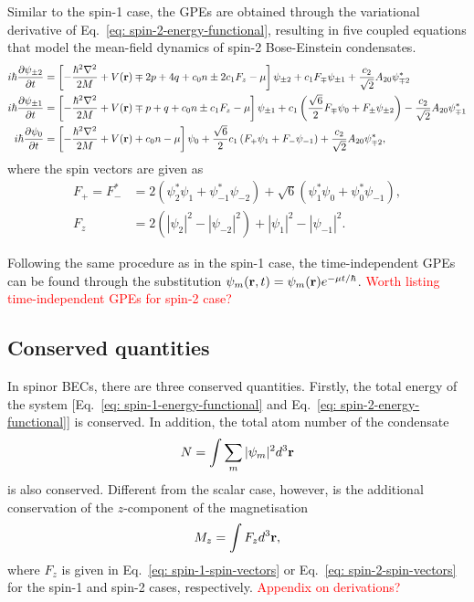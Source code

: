 Similar to the spin-1 case, the GPEs are obtained through the variational
derivative of Eq.~\eqref{eq: spin-2-energy-functional}, resulting in
five coupled equations that model the mean-field dynamics of spin-2
Bose-Einstein condensates.
\begin{align}
    i\hbar\pdv{\psi_{\pm 2}}{t} & = \left[-\frac{\hbar^2\nabla^2}{2M}
        + V(\vb{r}) \mp 2p + 4q + c_0n \pm 2c_1F_z - \mu\right]\psi_{\pm 2}
    + c_1F_{\mp}\psi_{\pm 1} + \frac{c_2}{\sqrt{2}}A_{20}\psi_{\mp 2}^*
    \label{eq: spin-2-GPEs-pm2}                                            \\
    i\hbar\pdv{\psi_{\pm 1}}{t} & = \left[-\frac{\hbar^2\nabla^2}{2M}
        + V(\vb{r}) \mp p + q + c_0n \pm c_1F_z - \mu\right]\psi_{\pm 1}
    + c_1\left(\frac{\sqrt{6}}{2}F_{\mp}\psi_0 + F_{\pm}\psi_{\pm 2}\right)
    - \frac{c_2}{\sqrt{2}}A_{20}\psi_{\mp 1}^* \label{eq: spin-2-GPEs-pm1} \\
    i\hbar\pdv{\psi_0}{t}       & = \left[-\frac{\hbar^2\nabla^2}{2M}
        + V(\vb{r}) + c_0n - \mu\right]\psi_0
    + \frac{\sqrt{6}}{2}c_1\left(F_+\psi_1 + F_-\psi_{-1}\right)
    + \frac{c_2}{\sqrt{2}}A_{20}\psi_{\mp 2}^*, \label{eq: spin-2-GPEs-0}
\end{align}
where the spin vectors are given as
\begin{align}\label{eq: spin-2-spin-vectors}
    F_+ = F_-^* & = 2(\psi_2^*\psi_1 + \psi_{-1}^*\psi_{-2})
    + \sqrt{6}(\psi_1^*\psi_0 + \psi_0^*\psi_{-1}),                             \\
    F_z         & = 2(|\psi_2|^2 - |\psi_{-2}|^2) + |\psi_1|^2 - |\psi_{-1}|^2.
\end{align}

Following the same procedure as in the spin-1 case, the time-independent GPEs
can be found through the substitution
\(\psi_m(\vb{r}, t) = \psi_m(\vb{r})e^{-\mu t/\hbar}\).
\textcolor{red}{Worth listing time-independent GPEs for spin-2 case?}

\subsection{Conserved quantities}
In spinor BECs, there are three conserved quantities.
Firstly, the total energy of the system
    [Eq.~\eqref{eq: spin-1-energy-functional} and
        Eq.~\eqref{eq: spin-2-energy-functional}] is conserved.
In addition, the total atom number of the condensate
\begin{equation}
    N = \int \sum_m |\psi_m|^2 d^3\vb{r}
\end{equation}
is also conserved.
Different from the scalar case, however, is the additional conservation of the
\(z\)-component of the magnetisation
\begin{equation}
    M_z = \int F_z d^3\vb{r},
\end{equation}
where \(F_z\) is given in Eq.~\eqref{eq: spin-1-spin-vectors} or
Eq.~\eqref{eq: spin-2-spin-vectors} for the spin-1 and spin-2 cases,
respectively.
\textcolor{red}{Appendix on derivations?}

